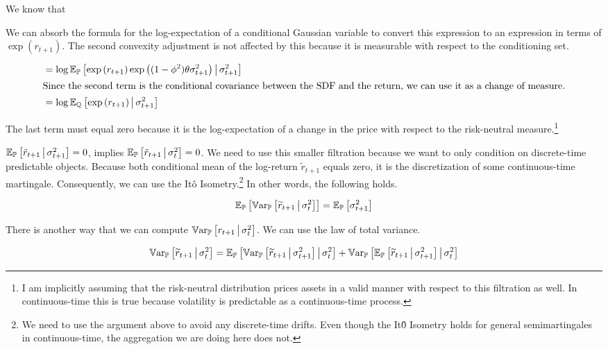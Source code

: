 \documentclass[11pt, letterpaper, twoside, final]{article}
\begin{document}
We know that  


We can absorb the formula for the log-expectation of a conditional Gaussian variable to convert this expression to
an expression in terms of $\exp(r_{t+1})$. 
The second convexity adjustment is not affected by this because it is measurable with respect to the conditioning
set.

\begin{align}
    &= \log \E_{\PP}\left[\exp\left(r_{t+1}\right) \exp\left((1 - \phi^2) \theta \sigma^2_{t+1}\right) \mvert
       \sigma^2_{t+1} \right]\\
%
    \intertext{Since the second term is the conditional covariance between the SDF and the return, we can use it
    as a change of measure.}
%
    &= \log \E_{\QQ}\left[\exp\left(r_{t+1}\right) \mvert \sigma^2_{t+1} \right]
\end{align}

The last term must equal zero because it is the log-expectation of a change in the price with respect to the
risk-neutral measure.\footnote{I am implicitly assuming that the risk-neutral distribution prices assets in a
    valid manner with respect to this filtration as well. In continuous-time this is true because volatility is
predictable as a continuous-time process.} 

$\operatorname{\mathbb{E}}_{\mathbb{P}}\left[\tilde{r}_{t+1} \,\middle\vert\, \sigma^2_{t+1} \right] = 0$, implies $\operatorname{\mathbb{E}}_{\mathbb{P}}\left[\tilde{r}_{t+1}
\,\middle\vert\, \sigma^2_{t} \right] = 0$.
We need to use this smaller filtration because we want to only condition on discrete-time predictable objects.
Because both conditional mean of the log-return $\tilde{r}_{t+1}$ equals zero, it is the discretization of some
continuous-time martingale. 
Consequently, we can use the It\^{o} Isometry.\footnote{We need to use the argument above to avoid any
    discrete-time drifts. Even though the It\^{0} Isometry holds for general semimartingales in continuous-time,
the aggregation we are doing here does not.} 
In other words, the following holds. 

\begin{equation}
    \label{eqn:return_var_versus_expected_vol_pp}
    \operatorname{\mathbb{E}}_{\mathbb{P}}\left[\operatorname{\mathbb{V}ar}_{\mathbb{P}}\left[\widetilde{r}_{t+1} \,\middle\vert\, \sigma^2_t \right]\right]  =
    \operatorname{\mathbb{E}}_{\mathbb{P}}\left[\sigma^2_{t+1} \right]
\end{equation}

There is another way that we can compute $\operatorname{\mathbb{V}ar}_{\mathbb{P}}\left[r_{t+1} \,\middle\vert\, \sigma^2_t \right]$.
We can use the law of total variance.

\begin{equation}
    \operatorname{\mathbb{V}ar}_{\mathbb{P}}\left[\widetilde{r}_{t+1} \,\middle\vert\, \sigma^2_t\right]  =
    \operatorname{\mathbb{E}}_{\mathbb{P}}\left[\operatorname{\mathbb{V}ar}_{\mathbb{P}}\left[\widetilde{r}_{t+1} \,\middle\vert\, \sigma^2_{t+1}\right] \,\middle\vert\, \sigma_t^2 \right] +
    \operatorname{\mathbb{V}ar}_{\mathbb{P}}\left[\operatorname{\mathbb{E}}_{\mathbb{P}}\left[\widetilde{r}_{t+1}\,\middle\vert\, \sigma_{t+1}^2\right] \,\middle\vert\, \sigma^2_t\right]
\end{equation}
\end{document}

